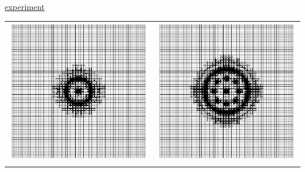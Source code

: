 \documentclass[compress,12pt]{beamer}
\begin{document}
\begin{frame}
{\begin{center}
      \end{center}
      \footnotesize
      \href{movies/plate_pattern_3.avi}{experiment}
    }
    {
      \begin{center}
	\begin{tabular}{cc}
	  \includegraphics[height=.4\textheight]{figures/mesh0010} &
	  \includegraphics[height=.4\textheight]{figures/mesh0015} \\ 

\end{tabular}
\end{center}}
\end{frame}
\end{document}
